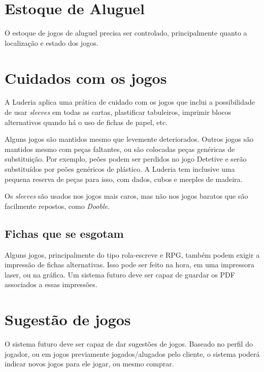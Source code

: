 

\section{Estoque de Aluguel}

O estoque de jogos de aluguel precisa ser controlado, principalmente quanto a localização e estado dos jogos.

\section{Cuidados com os jogos}

A Luderia aplica uma prática de cuidado com os jogos que inclui a possibilidade de usar \textit{sleeves} em todas as cartas, plastificar tabuleiros, imprimir blocos alternativos quando há o uso de fichas de papel, etc.

Alguns jogos são mantidos mesmo que levemente deteriorados. Outros jogos são mantidos mesmo com peças faltantes, ou são colocadas peças genéricas de substituição. Por exemplo, peões podem ser perdidos no jogo Detetive e serão substituídos por peões genéricos de plástico. A Luderia tem inclusive uma pequena reserva de peças para isso, com dados, cubos e meeples de madeira.

Os \textit{sleeves} são usados nos jogos mais caros, mas não nos jogos baratos que são facilmente repostos, como \textit{Dooble}. 


\subsection{Fichas que se esgotam}

Alguns jogos, principalmente do tipo rola-escreve e RPG, também podem exigir a impressão de fichas alternativas. Isso pode ser feito na hora, em uma impressora laser, ou na gráfica. Um sistema futuro deve ser capaz de guardar os PDF associados a essas impressões.


\section{Sugestão de jogos}
O sistema futuro deve ser capaz de dar sugestões de jogos. Baseado no perfil do jogador, ou em jogos previamente jogados/alugados pelo cliente, o sistema poderá indicar novos jogos para ele jogar, ou mesmo comprar. 






